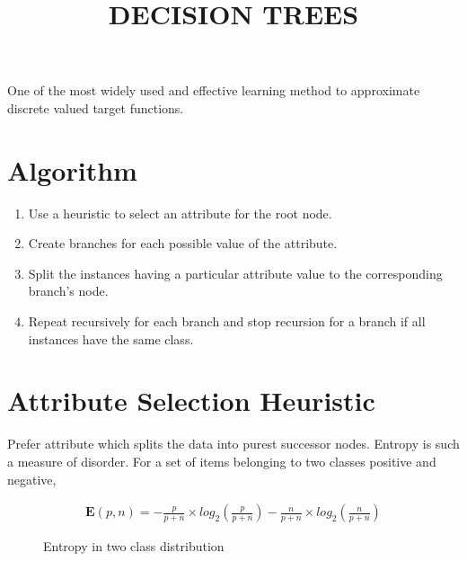\documentclass[11pt, a4paper]{article}
\begin{document}
\title{DECISION TREES}
\date{}
\maketitle

One of the most widely used and effective learning method to approximate discrete valued target functions.

\section{Algorithm}

\begin{enumerate}
	\item Use a heuristic to select an attribute for the root node.
	\item Create branches for each possible value of the attribute.
	\item Split the instances having a particular attribute value to the corresponding branch's node.
	\item Repeat recursively for each branch and stop recursion for a branch if all instances have the same class.
\end{enumerate}

\section{Attribute Selection Heuristic}

Prefer attribute which splits the data into purest successor nodes. Entropy is such a measure of disorder. For a set of items belonging to two classes positive and negative, 

\begin{align*}
	\mathbf{E}(p, n) = -\frac{p}{p + n} \times log_2(\frac{p}{p + n}) -\frac{n}{p + n} \times log_2(\frac{n}{p + n}) 
\end{align*}

\begin{figure}
	\centering
	\caption{Entropy in two class distribution}
\end{figure}
\end{document}
